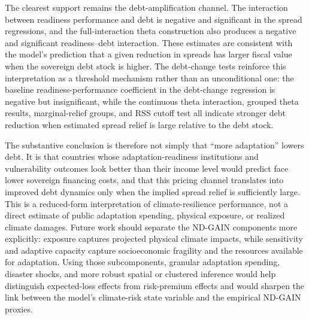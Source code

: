 \documentclass[11pt]{article}
\theoremstyle{definition}
\begin{document}
The clearest support remains the debt-amplification channel. The interaction between readiness performance and debt is negative and significant in the spread regressions, and the full-interaction theta construction also produces a negative and significant readiness--debt interaction. These estimates are consistent with the model's prediction that a given reduction in spreads has larger fiscal value when the sovereign debt stock is higher. The debt-change tests reinforce this interpretation as a threshold mechanism rather than an unconditional one: the baseline readiness-performance coefficient in the debt-change regression is negative but insignificant, while the continuous theta interaction, grouped theta results, marginal-relief groups, and RSS cutoff test all indicate stronger debt reduction when estimated spread relief is large relative to the debt stock.

The substantive conclusion is therefore not simply that ``more adaptation'' lowers debt. It is that countries whose adaptation-readiness institutions and vulnerability outcomes look better than their income level would predict face lower sovereign financing costs, and that this pricing channel translates into improved debt dynamics only when the implied spread relief is sufficiently large. This is a reduced-form interpretation of climate-resilience performance, not a direct estimate of public adaptation spending, physical exposure, or realized climate damages. Future work should separate the ND-GAIN components more explicitly: exposure captures projected physical climate impacts, while sensitivity and adaptive capacity capture socioeconomic fragility and the resources available for adaptation. Using those subcomponents, granular adaptation spending, disaster shocks, and more robust spatial or clustered inference would help distinguish expected-loss effects from risk-premium effects and would sharpen the link between the model's climate-risk state variable and the empirical ND-GAIN proxies.
\end{document}
